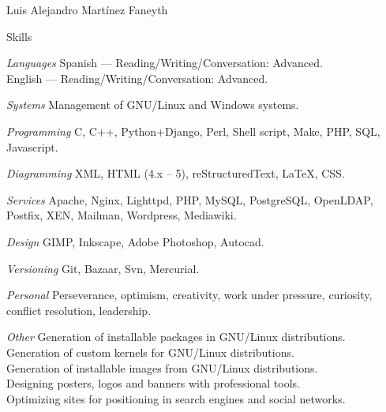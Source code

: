 \documentclass[11pt,letterpaper]{article}
\begin{document}
\begin{cv}{Luis Alejandro Mart\'inez Faneyth}
\begin{cvlist}{Skills}
\item[\textit{\large{Languages}}]{
	Spanish --- Reading/Writing/Conversation: Advanced.\\
	English --- Reading/Writing/Conversation: Advanced.
}
\item[\textit{\large{Systems}}]{Management of GNU/Linux and Windows systems.}
\item[\textit{\large{Programming}}]{C, C++, Python+Django, Perl, Shell script, Make, PHP, SQL, Javascript.}
\item[\textit{\large{Diagramming}}]{XML, HTML (4.x -- 5), reStructuredText, \LaTeX, CSS.}
\item[\textit{\large{Services}}]{Apache, Nginx, Lighttpd, PHP, MySQL, PostgreSQL, OpenLDAP, Postfix, XEN, Mailman, Wordpress, Mediawiki.}
\item[\textit{\large{Design}}]{GIMP, Inkscape, Adobe Photoshop, Autocad.}
\item[\textit{\large{Versioning}}]{Git, Bazaar, Svn, Mercurial.}
\item[\textit{\large{Personal}}]{Perseverance, optimism, creativity, work under pressure, curiosity, conflict resolution, leadership.}
\item[\textit{\large{Other}}]{
	Generation of installable packages in GNU/Linux distributions.\\
	Generation of custom kernels for GNU/Linux distributions.\\
	Generation of installable images from GNU/Linux distributions.\\
	Designing posters, logos and banners with professional tools.\\
	Optimizing sites for positioning in search engines and social networks.
}
\end{cvlist}

\end{cv}
\end{document}
